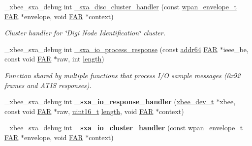\begin{DoxyCompactItemize}
\item 
\-\_\-xbee\-\_\-sxa\-\_\-debug int \hyperlink{group___s_x_a_ga7129f2a09a9a49d26c50cbff75e50232}{\-\_\-sxa\-\_\-disc\-\_\-cluster\-\_\-handler} (const \hyperlink{structwpan__envelope__t}{wpan\-\_\-envelope\-\_\-t} \hyperlink{group__hal_gaef060b3456fdcc093a7210a762d5f2ed}{F\-A\-R} $\ast$envelope, void \hyperlink{group__hal_gaef060b3456fdcc093a7210a762d5f2ed}{F\-A\-R} $\ast$context)
\begin{DoxyCompactList}\small\item\em Cluster handler for \char`\"{}\-Digi Node Identification\char`\"{} cluster. \end{DoxyCompactList}\item 
\-\_\-xbee\-\_\-sxa\-\_\-debug int \hyperlink{group___s_x_a_ga8b7ff9c6ba3a7223a6061b8ec52e195e}{\-\_\-sxa\-\_\-io\-\_\-process\-\_\-response} (const \hyperlink{unionaddr64}{addr64} \hyperlink{group__hal_gaef060b3456fdcc093a7210a762d5f2ed}{F\-A\-R} $\ast$ieee\-\_\-be, const void \hyperlink{group__hal_gaef060b3456fdcc093a7210a762d5f2ed}{F\-A\-R} $\ast$raw, int \hyperlink{group__zdo_gab2b3adeb2a67e656ff030b56727fd0ac}{length})
\begin{DoxyCompactList}\small\item\em Function shared by multiple functions that process I/\-O sample messages (0x92 frames and A\-T\-I\-S responses). \end{DoxyCompactList}\item 
\hypertarget{group___s_x_a_ga2cefa3759e8a990ec49519b6154295fe}{\-\_\-xbee\-\_\-sxa\-\_\-debug int {\bfseries \-\_\-sxa\-\_\-io\-\_\-response\-\_\-handler} (\hyperlink{structxbee__dev__t}{xbee\-\_\-dev\-\_\-t} $\ast$xbee, const void \hyperlink{group__hal_gaef060b3456fdcc093a7210a762d5f2ed}{F\-A\-R} $\ast$raw, \hyperlink{group__hal_ga5a8b2dc9e45a9ee81a94ef304fb62505}{uint16\-\_\-t} \hyperlink{group__zdo_gab2b3adeb2a67e656ff030b56727fd0ac}{length}, void \hyperlink{group__hal_gaef060b3456fdcc093a7210a762d5f2ed}{F\-A\-R} $\ast$context)}\label{group___s_x_a_ga2cefa3759e8a990ec49519b6154295fe}

\item 
\hypertarget{group___s_x_a_ga44f8ee62266041b8996967081fe6479f}{\-\_\-xbee\-\_\-sxa\-\_\-debug int {\bfseries \-\_\-sxa\-\_\-io\-\_\-cluster\-\_\-handler} (const \hyperlink{structwpan__envelope__t}{wpan\-\_\-envelope\-\_\-t} \hyperlink{group__hal_gaef060b3456fdcc093a7210a762d5f2ed}{F\-A\-R} $\ast$envelope, void \hyperlink{group__hal_gaef060b3456fdcc093a7210a762d5f2ed}{F\-A\-R} $\ast$context)}\label{group___s_x_a_ga44f8ee62266041b8996967081fe6479f}


\end{DoxyCompactItemize}
